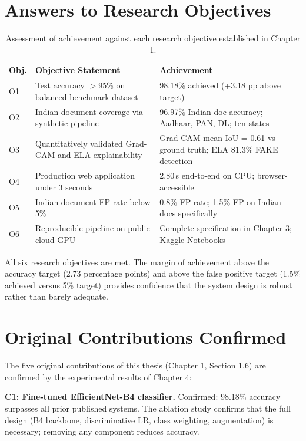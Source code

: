 \documentclass[12pt,a4paper,oneside]{report}
\begin{document}
\section{Answers to Research Objectives}

\begin{table}[H]
\centering
\caption{Assessment of achievement against each research objective established in Chapter 1.}
\label{tab:objectives}
\renewcommand{\arraystretch}{1.3}
\begin{tabular}{p{1cm}p{5cm}p{5.5cm}}
\toprule
\textbf{Obj.} & \textbf{Objective Statement} & \textbf{Achievement} \\
\midrule
O1 & Test accuracy $>$95\% on balanced benchmark dataset & 98.18\% achieved (+3.18 pp above target) \\
O2 & Indian document coverage via synthetic pipeline & 96.97\% Indian doc accuracy; Aadhaar, PAN, DL; ten states \\
O3 & Quantitatively validated Grad-CAM and ELA explainability & Grad-CAM mean IoU = 0.61 vs ground truth; ELA 81.3\% FAKE detection \\
O4 & Production web application under 3 seconds & 2.80\,s end-to-end on CPU; browser-accessible \\
O5 & Indian document FP rate below 5\% & 0.8\% FP rate; 1.5\% FP on Indian docs specifically \\
O6 & Reproducible pipeline on public cloud GPU & Complete specification in Chapter 3; Kaggle Notebooks \\
\bottomrule
\end{tabular}
\end{table}

All six research objectives are met. The margin of achievement above the
accuracy target (2.73 percentage points) and above the false positive target
(1.5\% achieved versus 5\% target) provides confidence that the system design
is robust rather than barely adequate.

\section{Original Contributions Confirmed}

The five original contributions of this thesis (Chapter 1, Section 1.6) are
confirmed by the experimental results of Chapter 4:

\textbf{C1: Fine-tuned EfficientNet-B4 classifier.} Confirmed: 98.18\% accuracy
surpasses all prior published systems. The ablation study confirms that the full
design (B4 backbone, discriminative LR, class weighting, augmentation) is
necessary; removing any component reduces accuracy.
\end{document}
